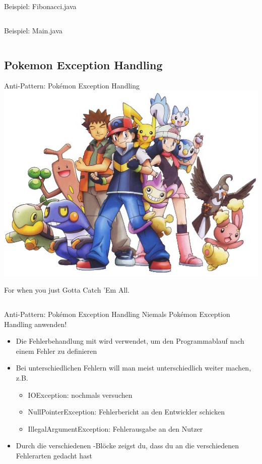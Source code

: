 \documentclass[usepdftitle=false,hyperref={pdfpagelabels=false}]{beamer}
\begin{document}
\begin{frame}{Beispiel: Fibonacci.java}
    \inputminted[linenos=true, numbersep=5pt, tabsize=4, fontsize=\tiny]{java}{Fibonacci.java}
\end{frame}

\begin{frame}{Beispiel: Main.java}
    \inputminted[linenos=true, numbersep=5pt, tabsize=4, fontsize=\tiny]{java}{Main-Fibonacci.java}
\end{frame}

\subsection{Pokemon Exception Handling}
\begin{frame}{Anti-Pattern: Pokémon Exception Handling}
    \includegraphics[width=0.5\linewidth]{pokemon.jpg}

    For when you just Gotta Catch 'Em All.
    \inputminted[linenos=false, numbersep=5pt, tabsize=4, fontsize=\tiny, firstline=5, lastline=9]{java}{singleLines.java}
\end{frame}

\begin{frame}{Anti-Pattern: Pokémon Exception Handling}
    Niemals Pokémon Exception Handling anwenden!
    \begin{itemize}[<+->]
        \item Die Fehlerbehandlung mit  wird verwendet,
              um den Programmablauf nach einem Fehler zu definieren
        \item Bei unterschiedlichen Fehlern will man meist unterschiedlich
              weiter machen, z.B.
            \begin{itemize}
                \item IOException: nochmals versuchen
                \item NullPointerException: Fehlerbericht an den Entwickler schicken
                \item IllegalArgumentException: Fehlerausgabe an den Nutzer
            \end{itemize}
        \item Durch die verschiedenen -Blöcke zeigst du,
              dass du an die verschiedenen Fehlerarten gedacht hast
    \end{itemize}
\end{frame}
\end{document}
